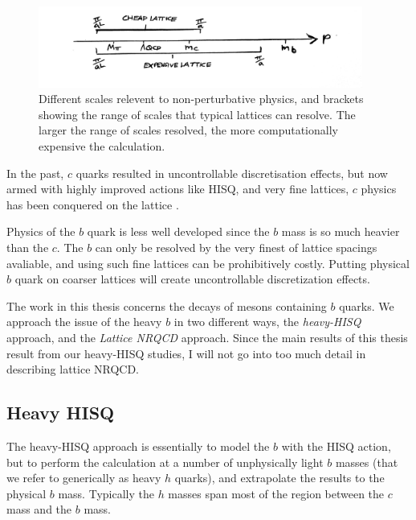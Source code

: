     \begin{figure}
      \vspace{-10pt}
      \begin{center}
        \includegraphics[width=
          0.95\textwidth]{images/scales.jpg}
      \end{center}
      \vspace{-15pt}
      \caption{Different scales relevent to non-perturbative physics, and brackets showing the range of scales that typical lattices can resolve. The larger the range of scales resolved, the more computationally expensive the calculation.}
    \end{figure}

    In the past, $c$ quarks resulted in uncontrollable discretisation effects, but now armed with highly improved actions like HISQ, and very fine lattices, $c$ physics has been conquered on the lattice \cite{Follana:2006rc,Allison:2008xk,Davies:2010ip,Donald:2012ga}.

    Physics of the $b$ quark is less well developed since the $b$ mass is so much heavier than the $c$. The $b$ can only be resolved by the very finest of lattice spacings avaliable, and using such fine lattices can be prohibitively costly. Putting physical $b$ quark on coarser lattices will create uncontrollable discretization effects.
    
    The work in this thesis concerns the decays of mesons containing $b$ quarks. We approach the issue of the heavy $b$ in two different ways, the {\it{heavy-HISQ}} approach, and the {\it{Lattice NRQCD}} approach. Since the main results of this thesis result from our heavy-HISQ studies, I will not go into too much detail in describing lattice NRQCD.

    \subsection{Heavy HISQ}

    The heavy-HISQ approach is essentially to model the $b$ with the HISQ action, but to perform the calculation at a number of unphysically light $b$ masses (that we refer to generically as heavy $h$ quarks), and extrapolate the results to the physical $b$ mass. Typically the $h$ masses span most of the region between the $c$ mass and the $b$ mass.


